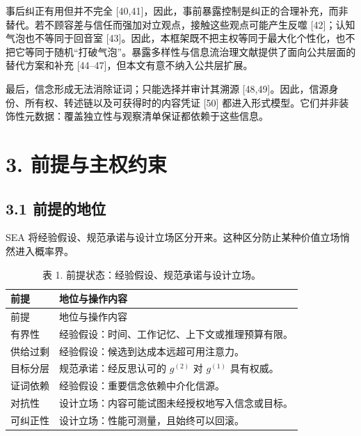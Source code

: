 \documentclass[
  chinese,
  11pt]{article}
\begin{document}
事后纠正有用但并不完全 {[}40,41{]}，因此，事前暴露控制是纠正的合理补充，而非替代。若不顾容差与信任而强加对立观点，接触这些观点可能产生反噬 {[}42{]}；认知气泡也不等同于回音室 {[}43{]}。因此，本框架既不把主权等同于最大化个性化，也不把它等同于随机``打破气泡''。暴露多样性与信息流治理文献提供了面向公共层面的替代方案和补充 {[}44--47{]}，但本文有意不纳入公共层扩展。

最后，信念形成无法消除证词；只能选择并审计其溯源 {[}48,49{]}。因此，信源身份、所有权、转述链以及可获得时的内容凭证 {[}50{]} 都进入形式模型。它们并非装饰性元数据：覆盖独立性与观察清单保证都依赖于这些信息。

\section{3. 前提与主权约束}\label{ux524dux63d0ux4e0eux4e3bux6743ux7ea6ux675f}

\subsection{3.1 前提的地位}\label{ux524dux63d0ux7684ux5730ux4f4d}

SEA 将经验假设、规范承诺与设计立场区分开来。这种区分防止某种价值立场悄然进入概率界。

\begin{longtable}[]{@{}
  >{\raggedright\arraybackslash}p{}
  >{\raggedright\arraybackslash}p{}@{}}
\caption{表 1. 前提状态：经验假设、规范承诺与设计立场。}\tabularnewline
\toprule\noalign{}
\begin{minipage}[b]{\linewidth}\raggedright
前提
\end{minipage} & \begin{minipage}[b]{\linewidth}\raggedright
地位与操作内容
\end{minipage} \\
\midrule\noalign{}
\endfirsthead
\toprule\noalign{}
\begin{minipage}[b]{\linewidth}\raggedright
前提
\end{minipage} & \begin{minipage}[b]{\linewidth}\raggedright
地位与操作内容
\end{minipage} \\
\midrule\noalign{}
\endhead
\bottomrule\noalign{}
\endlastfoot
有界性 & 经验假设：时间、工作记忆、上下文或推理预算有限。 \\
供给过剩 & 经验假设：候选到达成本远超可用注意力。 \\
目标分层 & 规范承诺：经反思认可的 \(g^{(2)}\) 对 \(g^{(1)}\) 具有权威。 \\
证词依赖 & 经验假设：重要信念依赖中介化信源。 \\
对抗性 & 设计立场：内容可能试图未经授权地写入信念或目标。 \\
可纠正性 & 设计立场：性能可测量，且始终可以回滚。 \\
\end{longtable}
\end{document}
